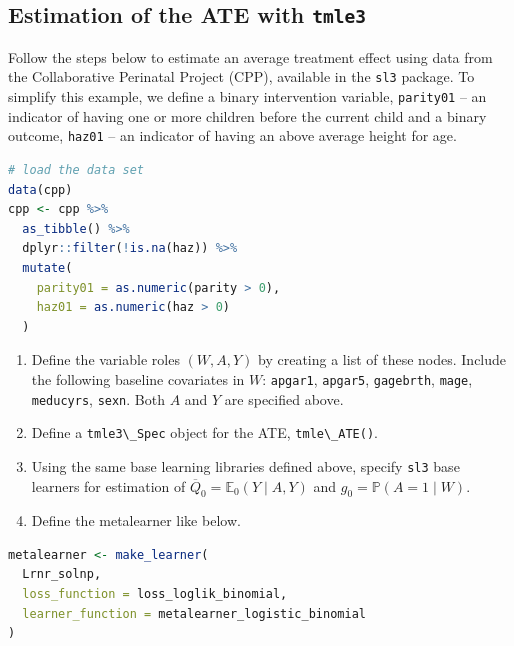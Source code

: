 \documentclass[
  12pt, krantz2,
]{book}
\newcommand{\passthrough}[1]{#1}
\providecommand{\tightlist}{%
  \setlength{\itemsep}{0pt}\setlength{\parskip}{0pt}}
\theoremstyle{definition}
\theoremstyle{definition}
\theoremstyle{definition}
\newcommand{\1}{\mathbbm{1}}
\begin{document}
\hypertarget{tmle3-ex1}{%
\subsection{\texorpdfstring{Estimation of the ATE with \texttt{tmle3}}{Estimation of the ATE with tmle3}}\label{tmle3-ex1}}

Follow the steps below to estimate an average treatment effect using data from
the Collaborative Perinatal Project (CPP), available in the \passthrough{\lstinline!sl3!} package. To
simplify this example, we define a binary intervention variable, \passthrough{\lstinline!parity01!} --
an indicator of having one or more children before the current child and a
binary outcome, \passthrough{\lstinline!haz01!} -- an indicator of having an above average height for
age.

\begin{lstlisting}[language=R]
# load the data set
data(cpp)
cpp <- cpp %>%
  as_tibble() %>%
  dplyr::filter(!is.na(haz)) %>%
  mutate(
    parity01 = as.numeric(parity > 0),
    haz01 = as.numeric(haz > 0)
  )
\end{lstlisting}

\begin{enumerate}
\def\labelenumi{\arabic{enumi}.}
\tightlist
\item
  Define the variable roles \((W,A,Y)\) by creating a list of these nodes.
  Include the following baseline covariates in \(W\): \passthrough{\lstinline!apgar1!}, \passthrough{\lstinline!apgar5!},
  \passthrough{\lstinline!gagebrth!}, \passthrough{\lstinline!mage!}, \passthrough{\lstinline!meducyrs!}, \passthrough{\lstinline!sexn!}. Both \(A\) and \(Y\) are specified
  above.
\item
  Define a \passthrough{\lstinline!tmle3\_Spec!} object for the ATE, \passthrough{\lstinline!tmle\_ATE()!}.
\item
  Using the same base learning libraries defined above, specify \passthrough{\lstinline!sl3!} base
  learners for estimation of \(\overline{Q}_0 = \mathbb{E}_0(Y \mid A,Y)\) and
  \(g_0 = \mathbb{P}(A = 1 \mid W)\).
\item
  Define the metalearner like below.
\end{enumerate}

\begin{lstlisting}[language=R]
metalearner <- make_learner(
  Lrnr_solnp,
  loss_function = loss_loglik_binomial,
  learner_function = metalearner_logistic_binomial
)
\end{lstlisting}
\end{document}
